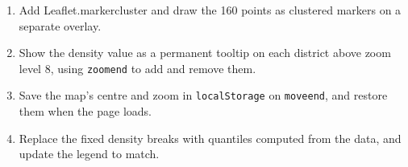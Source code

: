 \documentclass{article}
\newcommand{\cd}[1]{\texttt{#1}}
\begin{document}
\begin{enumerate}
  \item Add Leaflet.markercluster and draw the 160 points as clustered
        markers on a separate overlay.
  \item Show the density value as a permanent tooltip on each district
        above zoom level 8, using \cd{zoomend} to add and remove them.
  \item Save the map's centre and zoom in \cd{localStorage} on
        \cd{moveend}, and restore them when the page loads.
  \item Replace the fixed density breaks with quantiles computed from
        the data, and update the legend to match.
\end{enumerate}
\end{document}
